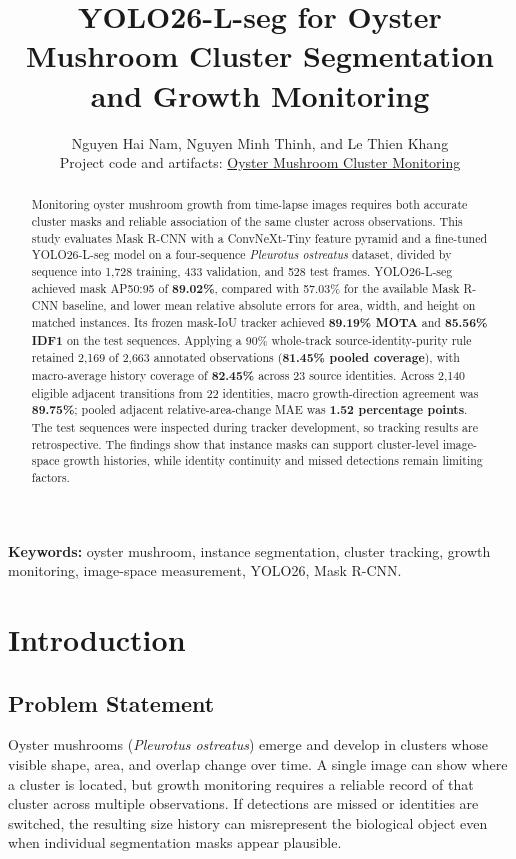 \documentclass[11pt,a4paper]{article}
\title{YOLO26-L-seg for Oyster Mushroom Cluster Segmentation and Growth Monitoring}
\author{Nguyen Hai Nam, Nguyen Minh Thinh, and Le Thien Khang\\
\small Project code and artifacts: \href{https://github.com/h-nam-sys/Oyster-Mushroom-Cluster-Monitoring}{Oyster Mushroom Cluster Monitoring}}
\date{}
\begin{document}
\maketitle

\begin{abstract}
Monitoring oyster mushroom growth from time-lapse images requires both accurate cluster masks and reliable association of the same cluster across observations. This study evaluates Mask R-CNN with a ConvNeXt-Tiny feature pyramid and a fine-tuned YOLO26-L-seg model on a four-sequence \emph{Pleurotus ostreatus} dataset, divided by sequence into 1,728 training, 433 validation, and 528 test frames. YOLO26-L-seg achieved mask AP50:95 of \textbf{89.02\%}, compared with 57.03\% for the available Mask R-CNN baseline, and lower mean relative absolute errors for area, width, and height on matched instances. Its frozen mask-IoU tracker achieved \textbf{89.19\% MOTA} and \textbf{85.56\% IDF1} on the test sequences. Applying a 90\% whole-track source-identity-purity rule retained 2,169 of 2,663 annotated observations (\textbf{81.45\% pooled coverage}), with macro-average history coverage of \textbf{82.45\%} across 23 source identities. Across 2,140 eligible adjacent transitions from 22 identities, macro growth-direction agreement was \textbf{89.75\%}; pooled adjacent relative-area-change MAE was \textbf{1.52 percentage points}. The test sequences were inspected during tracker development, so tracking results are retrospective. The findings show that instance masks can support cluster-level image-space growth histories, while identity continuity and missed detections remain limiting factors.
\end{abstract}

\noindent\textbf{Keywords:} oyster mushroom, instance segmentation, cluster tracking, growth monitoring, image-space measurement, YOLO26, Mask R-CNN.

\section{Introduction}

\subsection{Problem Statement}

Oyster mushrooms (\emph{Pleurotus ostreatus}) emerge and develop in clusters whose visible shape, area, and overlap change over time. A single image can show where a cluster is located, but growth monitoring requires a reliable record of that cluster across multiple observations. If detections are missed or identities are switched, the resulting size history can misrepresent the biological object even when individual segmentation masks appear plausible.
\end{document}
